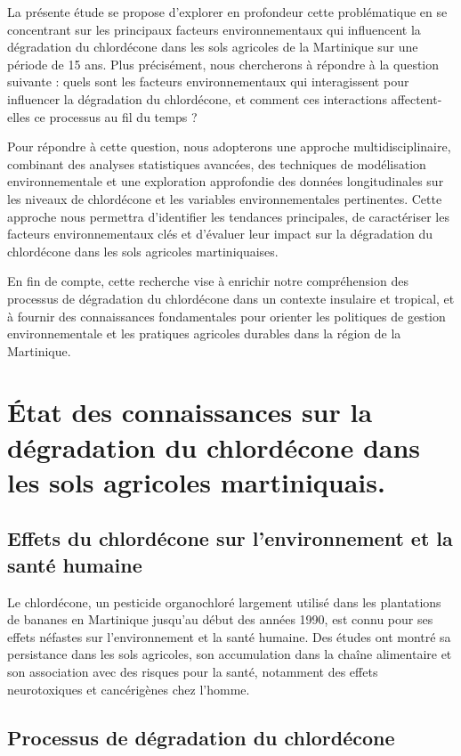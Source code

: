 \documentclass{report}
\begin{document}
La présente étude se propose d'explorer en profondeur cette problématique en se concentrant sur les principaux facteurs environnementaux qui influencent la dégradation du chlordécone dans les sols agricoles de la Martinique sur une période de 15 ans. Plus précisément, nous chercherons à répondre à la question suivante : quels sont les facteurs environnementaux qui interagissent pour influencer la dégradation du chlordécone, et comment ces interactions affectent-elles ce processus au fil du temps ?

Pour répondre à cette question, nous adopterons une approche multidisciplinaire, combinant des analyses statistiques avancées, des techniques de modélisation environnementale et une exploration approfondie des données longitudinales sur les niveaux de chlordécone et les variables environnementales pertinentes. Cette approche nous permettra d'identifier les tendances principales, de caractériser les facteurs environnementaux clés et d'évaluer leur impact sur la dégradation du chlordécone dans les sols agricoles martiniquaises.

En fin de compte, cette recherche vise à enrichir notre compréhension des processus de dégradation du chlordécone dans un contexte insulaire et tropical, et à fournir des connaissances fondamentales pour orienter les politiques de gestion environnementale et les pratiques agricoles durables dans la région de la Martinique.

\chapter*{État des connaissances sur la dégradation du chlordécone dans les sols agricoles martiniquais.}

\section{Effets du chlordécone sur l'environnement et la santé humaine}

Le chlordécone, un pesticide organochloré largement utilisé dans les plantations de bananes en Martinique jusqu'au début des années 1990, est connu pour ses effets néfastes sur l'environnement et la santé humaine. Des études ont montré sa persistance dans les sols agricoles, son accumulation dans la chaîne alimentaire et son association avec des risques pour la santé, notamment des effets neurotoxiques et cancérigènes chez l'homme.

\section{Processus de dégradation du chlordécone}
\end{document}

